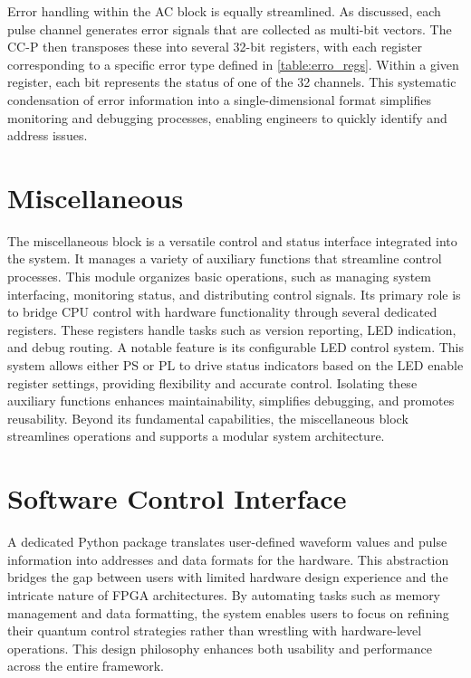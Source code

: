 Error handling within the AC block is equally streamlined. As discussed, each pulse channel generates error signals that are collected as multi-bit vectors. The CC-P then transposes these into several 32-bit registers, with each register corresponding to a specific error type defined in \autoref{table:erro_regs}. Within a given register, each bit represents the status of one of the 32 channels. This systematic condensation of error information into a single-dimensional format simplifies monitoring and debugging processes, enabling engineers to quickly identify and address issues.

\section{Miscellaneous}

The miscellaneous block is a versatile control and status interface integrated into the system. It manages a variety of auxiliary functions that streamline control processes. This module organizes basic operations, such as managing system interfacing, monitoring status, and distributing control signals. Its primary role is to bridge CPU control with hardware functionality through several dedicated registers. These registers handle tasks such as version reporting, LED indication, and debug routing. A notable feature is its configurable LED control system. This system allows either PS or PL to drive status indicators based on the LED enable register settings, providing flexibility and accurate control. Isolating these auxiliary functions enhances maintainability, simplifies debugging, and promotes reusability. Beyond its fundamental capabilities, the miscellaneous block streamlines operations and supports a modular system architecture.

\section{Software Control Interface}
A dedicated Python package translates user-defined waveform values and pulse information into addresses and data formats for the hardware. This abstraction bridges the gap between users with limited hardware design experience and the intricate nature of FPGA architectures. By automating tasks such as memory management and data formatting, the system enables users to focus on refining their quantum control strategies rather than wrestling with hardware-level operations. This design philosophy enhances both usability and performance across the entire framework.

